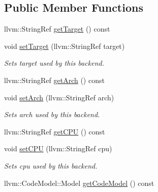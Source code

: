\subsection*{Public Member Functions}
\begin{DoxyCompactItemize}
\item 
llvm\+::\+String\+Ref \hyperlink{classglow_1_1_l_l_v_m_backend_a6b0a27a6fab23e210d639b5d43b74887}{get\+Target} () const
\item 
\mbox{\label{classglow_1_1_l_l_v_m_backend_ae29636d2a5743932d662ecd7baad09cd}} 
void \hyperlink{classglow_1_1_l_l_v_m_backend_ae29636d2a5743932d662ecd7baad09cd}{set\+Target} (llvm\+::\+String\+Ref target)
\begin{DoxyCompactList}\small\item\em Sets target used by this backend. \end{DoxyCompactList}\item 
llvm\+::\+String\+Ref \hyperlink{classglow_1_1_l_l_v_m_backend_ad7cf7f0d70f27878dc5164dd2367a51b}{get\+Arch} () const
\item 
\mbox{\label{classglow_1_1_l_l_v_m_backend_ad46ce074f3dc4e690070373c3cac0a51}} 
void \hyperlink{classglow_1_1_l_l_v_m_backend_ad46ce074f3dc4e690070373c3cac0a51}{set\+Arch} (llvm\+::\+String\+Ref arch)
\begin{DoxyCompactList}\small\item\em Sets arch used by this backend. \end{DoxyCompactList}\item 
llvm\+::\+String\+Ref \hyperlink{classglow_1_1_l_l_v_m_backend_a90a76325e581830aeea144f5b7a5d783}{get\+C\+PU} () const
\item 
\mbox{\label{classglow_1_1_l_l_v_m_backend_a9a0cbf789c9b2f1328fb3a88df59713b}} 
void \hyperlink{classglow_1_1_l_l_v_m_backend_a9a0cbf789c9b2f1328fb3a88df59713b}{set\+C\+PU} (llvm\+::\+String\+Ref cpu)
\begin{DoxyCompactList}\small\item\em Sets cpu used by this backend. \end{DoxyCompactList}\item 
llvm\+::\+Code\+Model\+::\+Model \hyperlink{classglow_1_1_l_l_v_m_backend_ab6a9fbd9d3dc9f01deb748cf996d4654}{get\+Code\+Model} () const
\item 

\end{DoxyCompactItemize}
